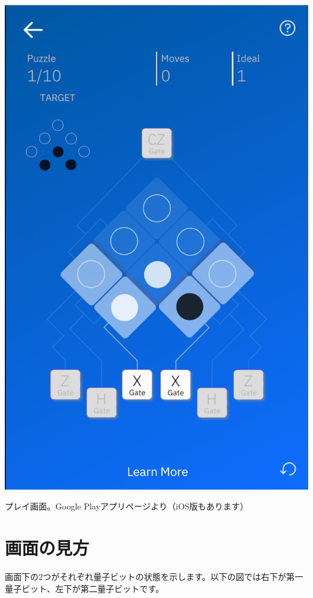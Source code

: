 \begin{reviewimage}
\includegraphics[width=0.2\maxwidth]{./images/image0.png}
\caption{プレイ画面。Google Playアプリページより（iOS版もあります）}
\label{image:01:image0}
\end{reviewimage}

\section*{画面の見方}
\label{sec:1-2}

画面下の2つがそれぞれ量子ビットの状態を示します。以下の図では右下が第一量子ビット、左下が第二量子ビットです。

